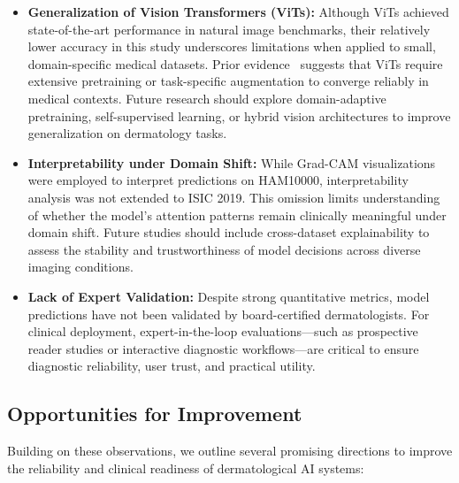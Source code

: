 \documentclass[pdflatex,sn-mathphys-num]{sn-jnl}%
\theoremstyle{thmstyleone}%
\theoremstyle{thmstyletwo}%
\theoremstyle{thmstylethree}%
\begin{document}
\begin{itemize}
    \item \textbf{Generalization of Vision Transformers (ViTs):} Although ViTs achieved state-of-the-art performance in natural image benchmarks, their relatively lower accuracy in this study underscores limitations when applied to small, domain-specific medical datasets. Prior evidence~\cite{he2023transformers} suggests that ViTs require extensive pretraining or task-specific augmentation to converge reliably in medical contexts. Future research should explore domain-adaptive pretraining, self-supervised learning, or hybrid vision architectures to improve generalization on dermatology tasks.

    \item \textbf{Interpretability under Domain Shift:} While Grad-CAM visualizations were employed to interpret predictions on HAM10000, interpretability analysis was not extended to ISIC 2019. This omission limits understanding of whether the model's attention patterns remain clinically meaningful under domain shift. Future studies should include cross-dataset explainability to assess the stability and trustworthiness of model decisions across diverse imaging conditions.

    \item \textbf{Lack of Expert Validation:} Despite strong quantitative metrics, model predictions have not been validated by board-certified dermatologists. For clinical deployment, expert-in-the-loop evaluations—such as prospective reader studies or interactive diagnostic workflows—are critical to ensure diagnostic reliability, user trust, and practical utility.
\end{itemize}

\subsection{Opportunities for Improvement}

Building on these observations, we outline several promising directions to improve the reliability and clinical readiness of dermatological AI systems:
\end{document}
